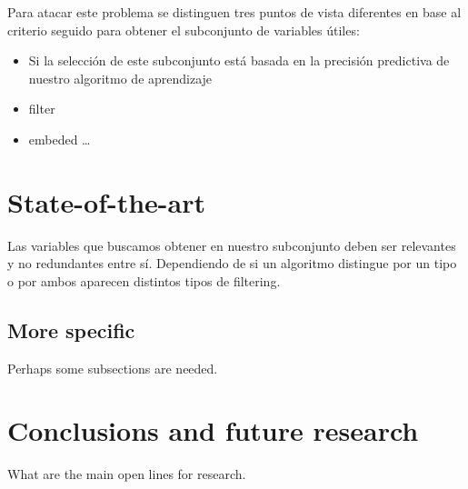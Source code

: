 \documentclass[a4paper,11pt]{article}
\begin{document}
Para atacar este problema se distinguen tres puntos de vista diferentes en base al criterio seguido para obtener el subconjunto de variables útiles:

\begin{itemize}
 
\item Si la selección de este subconjunto está basada en la precisión predictiva de nuestro algoritmo de aprendizaje
\item filter
\item embeded \ldots 
\end{itemize} 



\section{State-of-the-art}

Las variables que buscamos obtener en nuestro subconjunto deben ser relevantes y no redundantes entre sí. Dependiendo de si un algoritmo distingue por un tipo o por ambos aparecen distintos tipos de filtering.

    \subsection{More specific}


Perhaps some subsections are needed.

\section{Conclusions and future research}

What are the main open lines for research.
\end{document}

